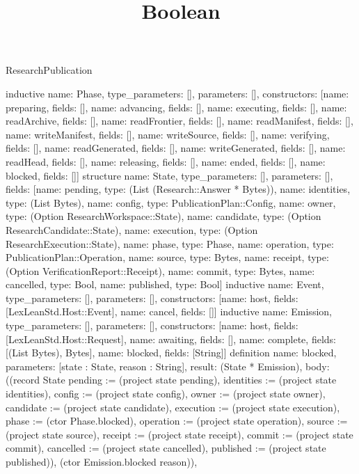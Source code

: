 \begin{lexlean}{ResearchPublication}
\title{Boolean}
\begin{semanticmodule}
inductive{
 name: Phase,
 type_parameters: [],
 parameters: [],
 constructors: [{name: preparing, fields: []}, {name: advancing, fields: []}, {name: executing, fields: []}, {name: readArchive, fields: []}, {name: readFrontier, fields: []}, {name: readManifest, fields: []}, {name: writeManifest, fields: []}, {name: writeSource, fields: []}, {name: verifying, fields: []}, {name: readGenerated, fields: []}, {name: writeGenerated, fields: []}, {name: readHead, fields: []}, {name: releasing, fields: []}, {name: ended, fields: []}, {name: blocked, fields: []}]
}
structure{
 name: State,
 type_parameters: [],
 parameters: [],
 fields: [{name: pending, type: (List (Research::Answer * Bytes))}, {name: identities, type: (List Bytes)}, {name: config, type: PublicationPlan::Config}, {name: owner, type: (Option ResearchWorkspace::State)}, {name: candidate, type: (Option ResearchCandidate::State)}, {name: execution, type: (Option ResearchExecution::State)}, {name: phase, type: Phase}, {name: operation, type: PublicationPlan::Operation}, {name: source, type: Bytes}, {name: receipt, type: (Option VerificationReport::Receipt)}, {name: commit, type: Bytes}, {name: cancelled, type: Bool}, {name: published, type: Bool}]
}
inductive{
 name: Event,
 type_parameters: [],
 parameters: [],
 constructors: [{name: host, fields: [LexLeanStd.Host::Event]}, {name: cancel, fields: []}]
}
inductive{
 name: Emission,
 type_parameters: [],
 parameters: [],
 constructors: [{name: host, fields: [LexLeanStd.Host::Request]}, {name: awaiting, fields: []}, {name: complete, fields: [(List Bytes), Bytes]}, {name: blocked, fields: [String]}]
}
definition{
 name: blocked,
 parameters: [state : State, reason : String],
 result: (State * Emission),
 body: ((record State {pending := (project state pending), identities := (project state identities), config := (project state config), owner := (project state owner), candidate := (project state candidate), execution := (project state execution), phase := (ctor Phase.blocked), operation := (project state operation), source := (project state source), receipt := (project state receipt), commit := (project state commit), cancelled := (project state cancelled), published := (project state published)}), (ctor Emission.blocked reason)),
}
\end{semanticmodule}
\end{lexlean}
